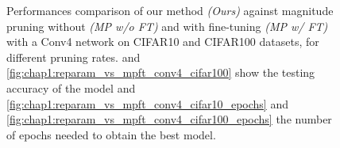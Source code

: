 \begin{figure}
  \caption{ Performances comparison of our method {\em(Ours)} against
  magnitude pruning without {\em(MP w/o FT)} and with fine-tuning {\em(MP w/ FT)} with a Conv4 network on
  CIFAR10 and CIFAR100 datasets, for different pruning rates.
   and
  \cref{fig:chap1:reparam_vs_mpft_conv4_cifar100} show the testing accuracy of
  the model and \cref{fig:chap1:reparam_vs_mpft_conv4_cifar10_epochs} and
  \cref{fig:chap1:reparam_vs_mpft_conv4_cifar100_epochs} the number of epochs
  needed to obtain the best model.}
  \label{fig:chap1:reparam_vs_mpft_conv4}
\end{figure}

\begin{figure}
  \centering
  \\

\end{figure}
